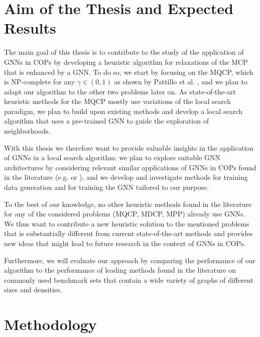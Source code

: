 \documentclass[11pt]{article}
\begin{document}
\section{Aim of the Thesis and Expected Results}
The main goal of this thesis is to contribute to the study of the application of GNNs in COPs by developing a heuristic algorithm for relaxations of the MCP that is enhanced by a GNN. To do so, we start by focusing on the MQCP, which is NP-complete for any $\gamma \in (0,1)$ as shown by Pattillo et al. \cite{pattillo_maximum_2013}, and we plan to adapt our algorithm to the other two problems later on. 
As state-of-the-art heuristic methods for the MQCP mostly use variations of the local search paradigm, we plan to build upon existing methods and develop a local search algorithm that uses a pre-trained GNN to guide the exploration of neighborhoods. 

With this thesis we therefore want to provide valuable insights in the application of GNNs in a local search algorithm: we plan to explore suitable GNN architectures by considering relevant similar applications of GNNs in COPs found in the literature (e.g. \cite{Kool2019} or \cite{Hudson2021}), and we develop and investigate methods for training data generation and for training the GNN tailored to our purpose. 

To the best of our knowledge, no other heuristic methods found in the literature for any of the considered problems (MQCP, MDCP, MPP) already use GNNs. We thus want to contribute a new heuristic solution to the mentioned problems that is substantially different from current state-of-the-art methods and provides new ideas that might lead to future research in the context of GNNs in COPs. 

Furthermore, 
we will evaluate our approach by comparing the performance of our algorithm to the performance of leading methods found in the literature on commonly used benchmark sets that contain a wide variety of graphs of different sizes and densities. 

\section{Methodology}
\end{document}

